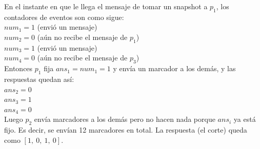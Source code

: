 \documentclass{article}
\begin{document}
En el instante en que le llega el mensaje de tomar un snapshot a $p_1$, los contadores de eventos son como sigue: \\
$num_1 = 1$ (envió un mensaje) \\
$num_2 = 0$ (aún no recibe el mensaje de $p_1$) \\
$num_3 = 1$ (envió un mensaje) \\
$num_4 = 0$ (aún no recibe el mensaje de $p_3$) \\
Entonces $p_1$ fija $ans_1 = num_1 = 1$ y envía un marcador a los demás, y las respuestas quedan así: \\
$ans_2 = 0$ \\
$ans_3 = 1$ \\
$ans_4 = 0$ \\
Luego $p_2$ envía marcadores a los demás pero no hacen nada porque $ans_i$ ya está fijo. Es decir, se envían 12 marcadores en total. La respuesta (el corte) queda como $[1,\ 0,\ 1,\ 0]$.
\end{document}
